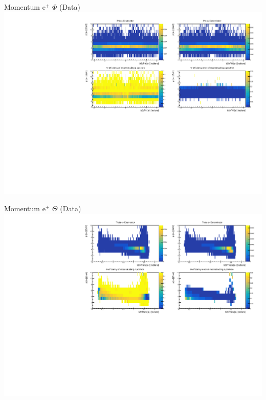 \documentclass[10pt]{beamer}
\begin{document}
\begin{frame}{Momentum $\textrm{e}^+$ $\Phi$ (Data)}
	\centering
	\includegraphics[width=\textwidth]{Momentum/MPhiep_Data}
\end{frame}


\begin{frame}{Momentum $\textrm{e}^+$ $\Theta$ (Data)}
	\centering
	\includegraphics[width=\textwidth]{Momentum/MThetaep_Data}
\end{frame}




\end{document}
